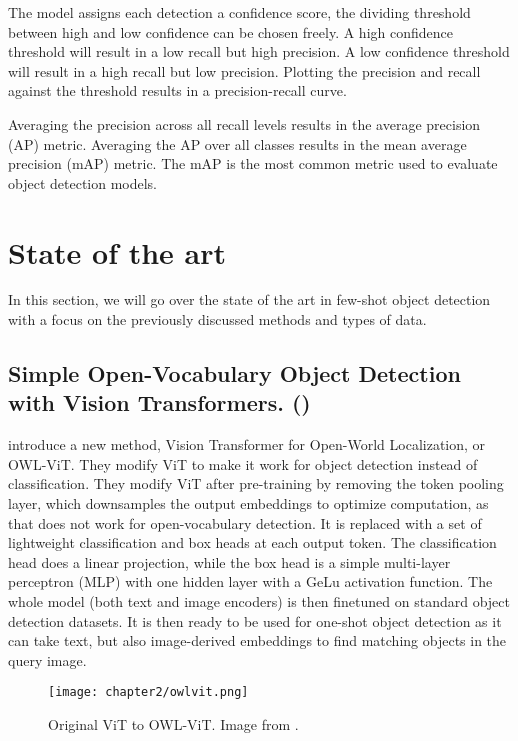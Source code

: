 The model assigns each detection a confidence score, the dividing threshold between high and low confidence can be chosen freely. A high confidence threshold will result in a low recall but high precision. A low confidence threshold will result in a high recall but low precision. Plotting the precision and recall against the threshold results in a precision-recall curve.

Averaging the precision across all recall levels results in the average precision (AP) metric. Averaging the AP over all classes results in the mean average precision (mAP) metric. The mAP is the most common metric used to evaluate object detection models.

\section{State of the art} 
In this section, we will go over the state of the art in few-shot object detection with a focus on the previously discussed methods and types of data.

\subsection*{Simple Open-Vocabulary Object Detection
with Vision Transformers. (\citet{owlvit})} \label{sec:2_owlvit}

\citet{owlvit} introduce a new method, Vision Transformer for Open-World Localization, or OWL-ViT. They modify ViT to make it work for object detection instead of classification. They modify ViT after pre-training by removing the token pooling layer, which downsamples the output embeddings to optimize computation, as that does not work for open-vocabulary detection. It is replaced with a set of lightweight classification and box heads at each output token. The classification head does a linear projection, while the box head is a simple multi-layer perceptron (MLP) with one hidden layer with a GeLu activation function. The whole model (both text and image encoders) is then finetuned on standard object detection datasets. It is then ready to be used for one-shot object detection as it can take text, but also image-derived embeddings to find matching objects in the query image.

\begin{figure}[h]
	\centering
	\texttt{[image: chapter2/owlvit.png]}
	\caption{\label{fig:2_owl-vitr} Original ViT to OWL-ViT. Image from \citet{owlvit}.}
\end{figure}


